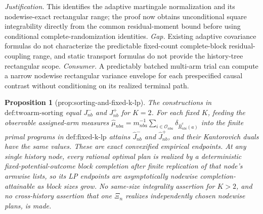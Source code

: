 \documentclass{article}
\newtheorem{proposition}{Proposition}
\begin{document}
\par\smallskip\noindent \textit{Justification.} This identifies the adaptive martingale normalization and its nodewise-exact rectangular range; the proof now obtains unconditional square integrability directly from the common residual-moment bound before using conditional complete-randomization identities. \textit{Gap.} Existing adaptive covariance formulas do not characterize the predictable fixed-count complete-block residual-coupling range, and static transport formulas do not provide the history-tree rectangular scope. \textit{Consumer.} A predictably batched multi-arm trial can compute a narrow nodewise rectangular variance envelope for each prespecified causal contrast without conditioning on its realized terminal path.

\begin{proposition}[prop:sorting-and-fixed-k-lp]\label{prop:sorting-and-fixed-k-lp}
The constructions in \(\text{def:twoarm-sorting}\) equal \(J_{nb}^{-}\) and \(J_{nb}^{+}\) for \(K=2\). For each fixed \(K\), feeding the observable assigned-arm measures \(\widehat\mu_{nba}=m_{nba}^{-1}\sum_{i\in\mathcal O_{nba}}\delta_{\widehat R_{nbi}^{c}(a)}\) into the finite primal programs in \(\text{def:fixed-k-lp}\) attains \(\widehat J_{nb}^{-}\) and \(\widehat J_{nb}^{+}\), and their Kantorovich duals have the same values. These are exact convexified empirical endpoints. At any single history node, every rational optimal plan is realized by a deterministic fixed-potential-outcome block completion after finite replication of that node's armwise lists, so its LP endpoints are asymptotically nodewise completion-attainable as block sizes grow. No same-size integrality assertion for \(K>2\), and no cross-history assertion that one \(\Xi_n\) realizes independently chosen nodewise plans, is made.
\end{proposition}
\end{document}
